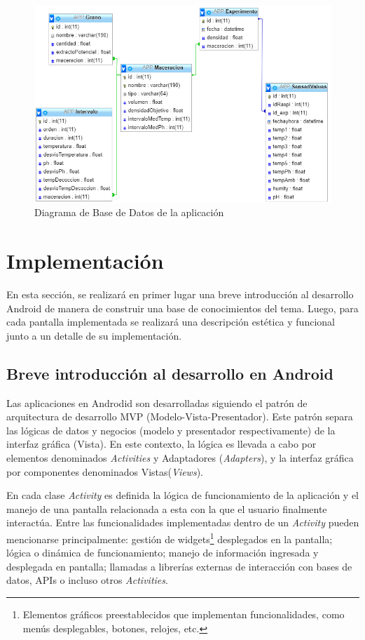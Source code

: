         \begin{figure}[h]
            \centering
            \includegraphics[scale=0.8]{DiagramaBaseDeDatosAPP.jpg}
            \caption{Diagrama de Base de Datos de la aplicación}
            \label{fig:DiagramaBdApp}
        \end{figure}

\section{Implementación}
    \par En esta sección, se realizará en primer lugar una breve introducción al desarrollo Android de manera de construir una base de conocimientos del tema. Luego, para cada pantalla implementada se realizará una descripción estética y funcional junto a un detalle de su implementación.
    
    \subsection{Breve introducción al desarrollo en Android}
    
    \par Las aplicaciones en Androdid son desarrolladas siguiendo el patrón de arquitectura de desarrollo MVP (Modelo-Vista-Presentador). Este patrón separa las lógicas de datos y negocios (modelo y presentador respectivamente) de la interfaz gráfica (Vista). En este contexto, la lógica es llevada a cabo por elementos denominados \textit{Activities} y Adaptadores (\textit{Adapters}), y la interfaz gráfica por componentes denominados Vistas(\textit{Views}).
    
    \par En cada clase \textit{Activity} es definida la lógica de funcionamiento de la aplicación y el manejo de una pantalla relacionada a esta con la que el usuario finalmente interactúa. Entre las funcionalidades implementadas dentro de un \textit{Activity} pueden mencionarse principalmente: gestión de widgets\footnote{Elementos gráficos preestablecidos que implementan funcionalidades, como menús desplegables, botones, relojes, etc.} desplegados en la pantalla; lógica o dinámica de funcionamiento; manejo de información ingresada y desplegada en pantalla; llamadas a librerías externas de interacción con bases de datos, APIs o incluso otros \textit{Activities}.
    
